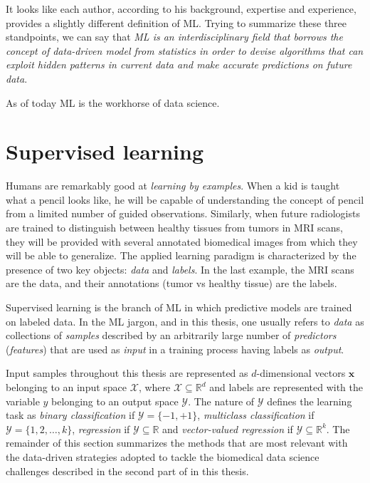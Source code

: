 It looks like each author, according to his background, expertise and experience, provides a slightly different definition of ML. Trying to summarize these three standpoints, we can say that \emph{ML is an interdisciplinary field that borrows the concept of data-driven model from statistics in order to devise algorithms that can exploit hidden patterns in current data and make accurate predictions on future data}.

As of today ML is the workhorse of data science.


  \section{Supervised learning} \label{subsec:supervised_learning}

  Humans are remarkably good at \emph{learning by examples}. When a kid is taught what a pencil looks like, he will be capable of understanding the concept of pencil from a limited number of guided observations. Similarly, when future radiologists are trained to distinguish between healthy tissues from tumors in MRI scans, they will be provided with several annotated biomedical images from which they will be able to generalize.
  The applied learning paradigm is characterized by the presence of two key objects: \textit{data} and \textit{labels}. In the last example, the MRI scans are the data, and their annotations (\eg tumor vs healthy tissue) are the labels.

  Supervised learning is the branch of ML in which predictive models are trained on labeled data. In the ML jargon, and in this thesis, one usually refers to \textit{data} as collections of \textit{samples} described by an arbitrarily large number of \textit{predictors} (\textit{features}) that are used as \textit{input} in a training process having labels as \textit{output}.

  Input samples throughout this thesis are represented as $d$-dimensional vectors $\bm{x}$ belonging to an input space $\mathcal{X}$, where $\mathcal{X}\subseteq\mathbb{R}^d$ and labels are represented with the variable $y$ belonging to an output space $\mathcal{Y}$.
  The nature of $\mathcal{Y}$ defines the learning task as \textit{binary classification} if  $\mathcal{Y} = \{-1,+1\}$, \textit{multiclass classification} if $\mathcal{Y} = \{1,2,\dots,k\}$,
  \textit{regression} if $\mathcal{Y}\subseteq\mathds{R}$ and
  \textit{vector-valued regression} if $\mathcal{Y}\subseteq\mathds{R}^k$.
  The remainder of this section summarizes the methods that are most relevant with the data-driven strategies adopted to tackle the biomedical data science challenges described in the second part of in this thesis.

